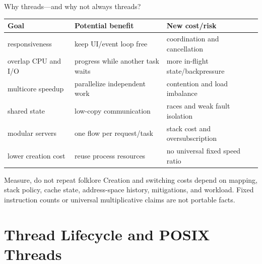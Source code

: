 \documentclass[aspectratio=169,11pt]{beamer}
\begin{document}
\begin{frame}{Why threads---and why not always threads?}
  \small
  \begin{tabularx}{\textwidth}{@{}lXX@{}}
    \toprule
    \textbf{Goal} & \textbf{Potential benefit} & \textbf{New cost/risk} \\
    \midrule
    responsiveness & keep UI/event loop free & coordination and cancellation \\
    overlap CPU and I/O & progress while another task waits & more in-flight state/backpressure \\
    multicore speedup & parallelize independent work & contention and load imbalance \\
    shared state & low-copy communication & races and weak fault isolation \\
    modular servers & one flow per request/task & stack cost and oversubscription \\
    lower creation cost & reuse process resources & no universal fixed speed ratio \\
    \bottomrule
  \end{tabularx}
  \begin{alertblock}{Measure, do not repeat folklore}
    Creation and switching costs depend on mapping, stack policy, cache state, address-space history, mitigations, and workload. Fixed instruction counts or universal multiplicative claims are not portable facts.
  \end{alertblock}
\end{frame}

\section{Thread Lifecycle and POSIX Threads}
\end{document}
